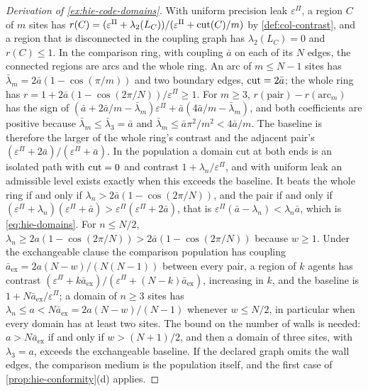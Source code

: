 \begin{proof}[Derivation of \cref{ex:hie-code-domains}]
With uniform precision leak $\varepsilon^\Pi$, a region $C$ of $m$ sites has $r(C)=(\varepsilon^\Pi+\lambda_2(L_C))/(\varepsilon^\Pi+\operatorname{cut}(C)/m)$ by \cref{def:col-contrast}, and a region that is disconnected in the coupling graph has $\lambda_2(L_C)=0$ and $r(C)\le1$. In the comparison ring, with coupling $\bar a$ on each of its $N$ edges, the connected regions are arcs and the whole ring. An arc of $m\le N-1$ sites has $\bar\lambda_m=2\bar a(1-\cos(\pi/m))$ and two boundary edges, $\operatorname{cut}=2\bar a$; the whole ring has $r=1+2\bar a(1-\cos(2\pi/N))/\varepsilon^\Pi\ge1$. For $m\ge3$, $r(\text{pair})-r(\text{arc}_m)$ has the sign of $(\bar a+2\bar a/m-\bar\lambda_m)\varepsilon^\Pi+\bar a(4\bar a/m-\bar\lambda_m)$, and both coefficients are positive because $\bar\lambda_m\le\bar\lambda_3=\bar a$ and $\bar\lambda_m\le\bar a\pi^2/m^2<4\bar a/m$. The baseline is therefore the larger of the whole ring's contrast and the adjacent pair's $(\varepsilon^\Pi+2\bar a)/(\varepsilon^\Pi+\bar a)$. In the population a domain cut at both ends is an isolated path with $\operatorname{cut}=0$ and contrast $1+\lambda_n/\varepsilon^\Pi$, and with uniform leak an admissible level exists exactly when this exceeds the baseline. It beats the whole ring if and only if $\lambda_n>2\bar a(1-\cos(2\pi/N))$, and the pair if and only if $(\varepsilon^\Pi+\lambda_n)(\varepsilon^\Pi+\bar a)>\varepsilon^\Pi(\varepsilon^\Pi+2\bar a)$, that is $\varepsilon^\Pi(\bar a-\lambda_n)<\lambda_n\bar a$, which is \eqref{eq:hie-domains}. For $n\le N/2$, $\lambda_n\ge2a(1-\cos(2\pi/N))>2\bar a(1-\cos(2\pi/N))$ because $w\ge1$. Under the exchangeable clause the comparison population has coupling $\bar a_{\mathrm{ex}}=2a(N-w)/(N(N-1))$ between every pair, a region of $k$ agents has contrast $(\varepsilon^\Pi+k\bar a_{\mathrm{ex}})/(\varepsilon^\Pi+(N-k)\bar a_{\mathrm{ex}})$, increasing in $k$, and the baseline is $1+N\bar a_{\mathrm{ex}}/\varepsilon^\Pi$; a domain of $n\ge3$ sites has $\lambda_n\le a<N\bar a_{\mathrm{ex}}=2a(N-w)/(N-1)$ whenever $w\le N/2$, in particular when every domain has at least two sites. The bound on the number of walls is needed: $a>N\bar a_{\mathrm{ex}}$ if and only if $w>(N+1)/2$, and then a domain of three sites, with $\lambda_3=a$, exceeds the exchangeable baseline. If the declared graph omits the wall edges, the comparison medium is the population itself, and the first case of \cref{prop:hie-conformity}(d) applies.
\end{proof}

